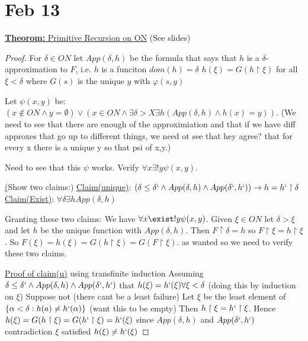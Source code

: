 \documentclass{article}
\begin{document}
    \section{Feb 13}
    \underline{\textbf{Theorom:} Primitive Recursion on ON}
    (See slides)
    \begin{proof}
        For $\delta \in ON$ let $App(\delta,h)$ be the formula that says that $h$ is a $\delta$-approximation to $F$, i.e.
        $h$ is a funciton
        $dom(h)=\delta$
        $h(\xi)=G(h \upharpoonright \xi)$ for all $\xi < \delta$
        where $G(s)$ is the unique $y$ with $\varphi(s,y)$

        Let $\psi (x,y)$ be: $(x \notin ON \wedge y = \emptyset) \vee (x \in ON \wedge \exists \delta > X \exists h(App(\delta,h) \wedge h(x) = y))$.
        (We need to see that there are enough of the approximiation and that if we have diff approxes that go up to different things, we need ot see that hey agree?
        that for every x there is a unique y so that psi of x,y.)

        Need to see that this $\psi$ works.
        Verify $\forall x \exists! y \psi(x,y)$.

        \underline(Show two claims:)
        \underline{Claim(unique)}: $(\delta \leq \delta` \wedge App(\delta,h) \wedge App(\delta`,h`)) \rightarrow h=h` \upharpoonright \delta$
        \underline{Claim(Exist)}: $\forall \delta \exists h App(\delta,h)$

        Granting these two claims:
        We have $\forall x \exist! y \psi(x,y)$.
        Given $\xi \in ON$ let $\delta > \xi$ and let $h$ be the unique function with $App(\delta,h)$.
        Then $F \upharpoonright \delta = h$ so $F \upharpoonright \xi = h \upharpoonright \xi$.
        So $F(\xi) = h(\xi) = G(h \upharpoonright \xi) = G(F \upharpoonright \xi)$.
        as wanted so we need to verify these two claims.

        \underline{Proof of claim(u)} using transfinite induction
        Assuming $\delta \leq \delta` \wedge App(\delta,h) \wedge App(\delta`,h`)$ that $h(\xi)=h`(\xi) \forall \xi < \delta$
        (doing this by induction on $\xi$)
        Suppose not (there cant be a least failure)
        Let $\xi$ be the least element of $\{\alpha < \delta : h(a) \neq h`(\alpha)\}$ (want this to be empty)
        Then $h \upharpoonright \xi = h` \upharpoonright \xi$.
        Hence $h(\xi) = G(h \upharpoonright \xi) = G(h` \upharpoonright \xi) = h`(\xi)$
        since $App(\delta,h)$ and $App(\delta`,h`)$
        contradiction $\xi$ satisfied $h(\xi) \neq h`(\xi)$


\end{proof}
\end{document}
